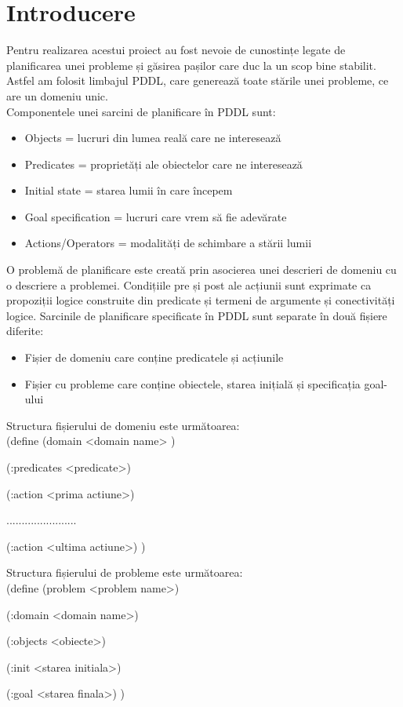  \section{Introducere}

Pentru realizarea acestui proiect au fost nevoie de cunostințe legate de planificarea unei probleme și găsirea pașilor care duc la un scop bine stabilit.
Astfel am folosit limbajul PDDL, care generează toate stările unei probleme, ce are un domeniu unic.
\\ 

Componentele unei sarcini de planificare în PDDL sunt:
 \begin{itemize}
    \setlength\itemsep{0em}
    \item Objects = lucruri din lumea reală care ne interesează
    
    \item  Predicates = proprietăți ale obiectelor care ne interesează
    \item Initial state  = starea lumii în care începem
    \item Goal specification = lucruri care vrem să fie adevărate
    \item Actions/Operators =  modalități de schimbare a stării lumii
\end{itemize}

O problemă de planificare este creată prin asocierea unei descrieri de domeniu cu o descriere a problemei. Condițiile pre și post ale acțiunii sunt exprimate ca propoziții logice construite din predicate și termeni de argumente și conectivități logice.
\newline
\newline
Sarcinile de planificare specificate în PDDL sunt separate în două fișiere diferite:

 \begin{itemize}
    \setlength\itemsep{0em}
    \item Fișier de domeniu care conține predicatele și acțiunile
       \item Fișier cu probleme care conține obiectele, starea inițială și specificația goal-ului
    
\end{itemize}

Structura fișierului de domeniu este următoarea:
\bigskip
\\

(define (domain <domain  name> )

 (:predicates <predicate>)

         (:action  <prima actiune>)
      
         .......................
      
         (:action  <ultima actiune>)
)

\bigskip

Structura fișierului de probleme este următoarea:
\bigskip
\\

(define (problem <problem name>)

        (:domain <domain name>)
        
        (:objects  <obiecte>)
    
        (:init <starea initiala>)
     
        (:goal <starea finala>)
)